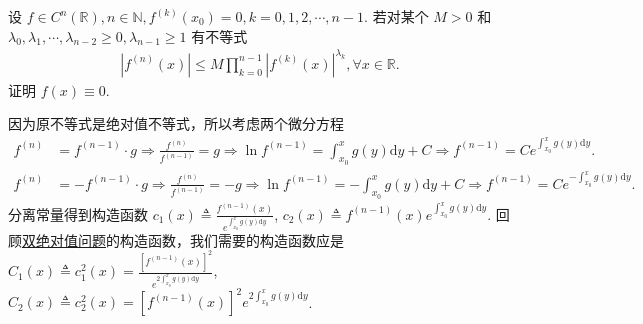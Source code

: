 \documentclass[../../main.tex]{subfiles}
\begin{document}
\begin{example}
设 $f \in C^n(\mathbb{R}), n \in \mathbb{N}, f^{(k)}(x_0) = 0, k = 0, 1, 2, \cdots, n - 1$. 若对某个 $M > 0$ 和 $\lambda_0, \lambda_1, \cdots, \lambda_{n - 2} \geqslant  0, \lambda_{n - 1} \geqslant  1$ 有不等式
\begin{align*}
|f^{(n)}(x)| \leqslant  M \prod_{k = 0}^{n - 1} |f^{(k)}(x)|^{\lambda_k}, \forall x \in \mathbb{R}.
\end{align*}
证明 $f(x) \equiv 0$.
\end{example}
\begin{note}
因为原不等式是绝对值不等式，所以考虑两个微分方程
\begin{align*}
f^{(n)} &= f^{(n-1)} \cdot g \Rightarrow \frac{f^{(n)}}{f^{(n-1)}} = g \Rightarrow \ln f^{(n-1)} = \int_{x_0}^x g(y) \mathrm{d}y + C \Rightarrow f^{(n-1)} = C e^{\int_{x_0}^x g(y) \mathrm{d}y}.
\end{align*}
\begin{align*}
f^{(n)} &= -f^{(n-1)} \cdot g \Rightarrow \frac{f^{(n)}}{f^{(n-1)}} = -g \Rightarrow \ln f^{(n-1)} = -\int_{x_0}^x g(y) \mathrm{d}y + C \Rightarrow f^{(n-1)} = C e^{-\int_{x_0}^x g(y) \mathrm{d}y}.
\end{align*}
分离常量得到构造函数 $c_1(x) \triangleq \frac{f^{(n-1)}(x)}{e^{\int_{x_0}^x g(y) \mathrm{d}y}}$, $c_2(x) \triangleq f^{(n-1)}(x) e^{\int_{x_0}^x g(y) \mathrm{d}y}$.
回顾\hyperref[subsection:双绝对值问题]{双绝对值问题}的构造函数，我们需要的构造函数应是 $C_1(x) \triangleq c_1^2(x) = \frac{[f^{(n-1)}(x)]^2}{e^{2\int_{x_0}^x g(y) \mathrm{d}y}}$, $C_2(x) \triangleq c_2^2(x) = [f^{(n-1)}(x)]^2 e^{2\int_{x_0}^x g(y) \mathrm{d}y}$.
\end{note}
\end{document}
